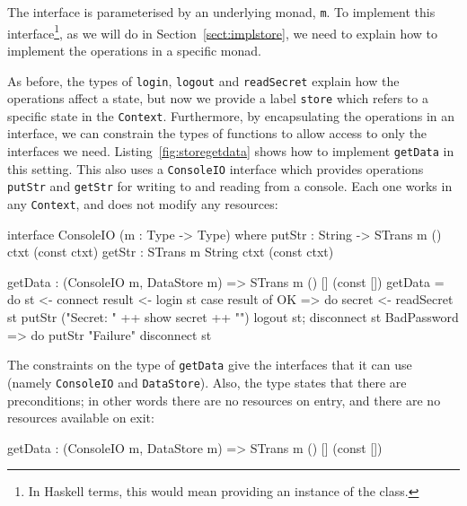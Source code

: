 The interface is parameterised by an underlying monad, \texttt{m}.  To
implement this interface\footnote{In Haskell terms, this would mean providing
an instance of the class.}, as we will do in Section~\ref{sect:implstore}, we
need to explain how to implement the operations in a specific monad. 

As before, the types of \texttt{login}, \texttt{logout} and \texttt{readSecret}
explain how the operations affect a state, but now we provide a label
\texttt{store} which refers to a specific state in the \texttt{Context}.
Furthermore, by encapsulating the operations in an interface, we can
constrain the types of functions to allow access to only the interfaces
we need. Listing~\ref{fig:storegetdata} shows how to implement
\texttt{getData} in this setting. 
This also uses a \texttt{ConsoleIO} interface which provides operations
\texttt{putStr} and \texttt{getStr} for writing to and reading from a console.
Each one works in any \texttt{Context}, and does not modify any resources:

\small
\begin{code}
interface ConsoleIO (m : Type -> Type) where
  putStr : String -> STrans m () ctxt (const ctxt)
  getStr : STrans m String ctxt (const ctxt)
\end{code}
\normalsize


\small
\begin{code}[float=h, frame=single,caption={Implementing \texttt{getData}
using the \texttt{DataStore} interface},label=fig:storegetdata]
getData : (ConsoleIO m, DataStore m) => STrans m () [] (const [])
getData = do st <- connect
             result <- login st
             case result of
                  OK => do secret <- readSecret st
                           putStr ("Secret: " ++ show secret ++ "\n")
                           logout st; disconnect st
                  BadPassword => do putStr "Failure\n"
                                    disconnect st
\end{code}
\normalsize

The constraints on the type of \texttt{getData} give the interfaces that it can
use (namely \texttt{ConsoleIO} and \texttt{DataStore}). Also, the type states
that there are  preconditions; in other words there are no resources
on entry, and there are no resources available on exit:

\small
\begin{code}
getData : (ConsoleIO m, DataStore m) => STrans m () [] (const [])
\end{code}
\normalsize

